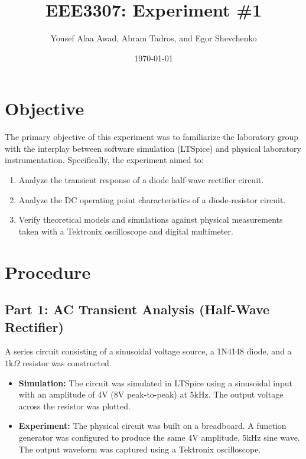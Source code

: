\documentclass{article}
\title{EEE3307: Experiment \#1}
\author{Yousef Alaa Awad, Abram Tadros, and Egor Shevchenko}
\date{\today}
\begin{document}
\maketitle
\tableofcontents
\newpage

\section{Objective}
The primary objective of this experiment was to familiarize the laboratory group with the interplay between software simulation (LTSpice) and physical laboratory instrumentation. Specifically, the experiment aimed to:
\begin{enumerate}
    \item Analyze the transient response of a diode half-wave rectifier circuit.
    \item Analyze the DC operating point characteristics of a diode-resistor circuit.
    \item Verify theoretical models and simulations against physical measurements taken with a Tektronix oscilloscope and digital multimeter.
\end{enumerate}

\section{Procedure}

\subsection{Part 1: AC Transient Analysis (Half-Wave Rectifier)}
A series circuit consisting of a sinusoidal voltage source, a 1N4148 diode, and a $1\text{k}\Omega$ resistor was constructed.
\begin{itemize}
    \item \textbf{Simulation:} The circuit was simulated in LTSpice using a sinusoidal input with an amplitude of 4V (8V peak-to-peak) at 5kHz. The output voltage across the resistor was plotted.
    \item \textbf{Experiment:} The physical circuit was built on a breadboard. A function generator was configured to produce the same 4V amplitude, 5kHz sine wave. The output waveform was captured using a Tektronix oscilloscope.
\end{itemize}
\end{document}
